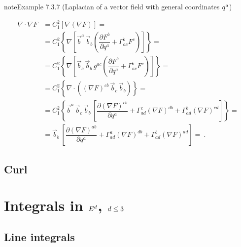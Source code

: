 \documentclass[letterpaper,10pt,english]{jupyterBook}
\begin{document}
\label{ch/tensor-algebra-calculus/calculus-euclidean:example-10}
\begin{sphinxadmonition}{note}{Example 7.3.7 (Laplacian of a vector field \sphinxhyphen{} with general coordinates \protect\(q^a\protect\))}


\begin{equation*}
\begin{split}
\nabla \cdot \nabla F
  & = C_{1}^2 \left[ \nabla \left( \nabla F \right) \right] = \\
  & = C_{1}^2 \left\{ \nabla \left[ \vec{b}^a \, \vec{b}_b \left( \dfrac{\partial F^b}{\partial q^a} + \Gamma^{b}_{ac} F^c \right) \right] \right\} = \\
  & = C_{1}^2 \left\{ \nabla \left[ \vec{b}_c \, \vec{b}_b \,  g^{ac} \left( \dfrac{\partial F^b}{\partial q^a} + \Gamma^{b}_{ac} F^c \right) \right] \right\} = \\
  & = C_{1}^2 \left\{ \nabla \cdot \left((\nabla F)^{cb} \, \vec{b}_c \, \vec{b}_b \right) \right\} = \\
  & = C_{1}^2 \left\{ \vec{b}^a \, \vec{b}_c \, \vec{b}_b \, \left[ \dfrac{\partial (\nabla F)^{cb}}{\partial q^a} 
     + \Gamma_{ad}^c (\nabla F)^{db} + \Gamma_{ad}^b (\nabla F)^{cd} \right] \right\} = \\
  & = \vec{b}_b \, \left[ \dfrac{\partial (\nabla F)^{ab}}{\partial q^a} 
     + \Gamma_{ad}^a (\nabla F)^{db} + \Gamma_{ad}^b (\nabla F)^{ad} \right] = \ .
\end{split}
\end{equation*}\end{sphinxadmonition}


\subsection{Curl}
\label{\detokenize{ch/tensor-algebra-calculus/calculus-euclidean:curl}}\label{\detokenize{ch/tensor-algebra-calculus/calculus-euclidean:tensor-calculus-differential-operators-curl}}

\section{Integrals in \protect\(E^d\protect\), \protect\(d \le 3\protect\)}
\label{\detokenize{ch/tensor-algebra-calculus/calculus-euclidean:integrals-in-e-d-d-le-3}}\label{\detokenize{ch/tensor-algebra-calculus/calculus-euclidean:tensor-calculus-integrals}}

\subsection{Line integrals}
\label{\detokenize{ch/tensor-algebra-calculus/calculus-euclidean:line-integrals}}\label{\detokenize{ch/tensor-algebra-calculus/calculus-euclidean:tensor-calculus-integrals-line}}
\end{document}
